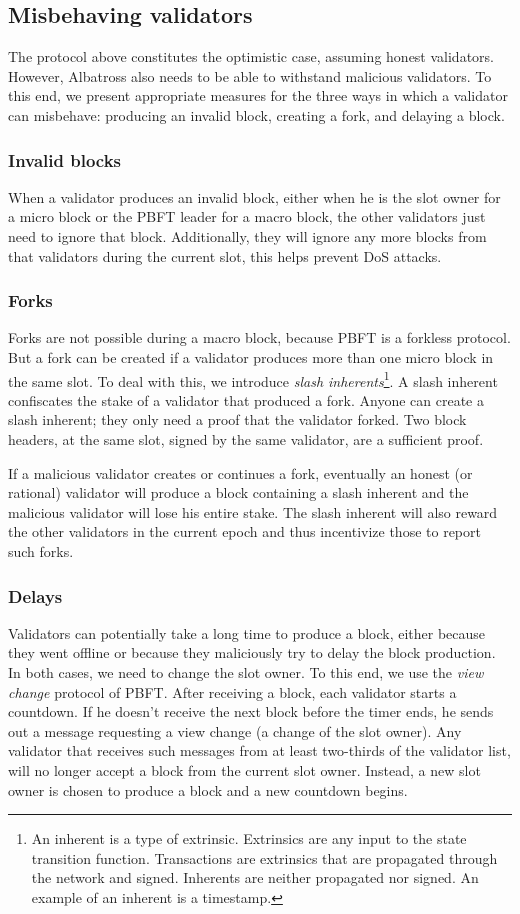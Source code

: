 \documentclass[conference]{IEEEtran}
\begin{document}
\subsection{Misbehaving validators}
The protocol above constitutes the optimistic case, assuming honest validators. However, Albatross also needs to be able to withstand malicious validators. To this end, we present appropriate measures for the three ways in which a validator can misbehave: producing an invalid block, creating a fork, and delaying a block.

\subsubsection{Invalid blocks}
When a validator produces an invalid block, either when he is the slot owner for a micro block or the PBFT leader for a macro block, the other validators just need to ignore that block. Additionally, they will ignore any more blocks from that validators during the current slot, this helps prevent DoS attacks.

\subsubsection{Forks}
Forks are not possible during a macro block, because PBFT is a forkless protocol. But a fork can be created if a validator produces more than one micro block in the same slot. To deal with this, we introduce \textit{slash inherents}\footnote{An inherent is a type of extrinsic. Extrinsics are any input to the state transition function. Transactions are extrinsics that are propagated through the network and signed. Inherents are neither propagated nor signed. An example of an inherent is a timestamp.}. A slash inherent confiscates the stake of a validator that produced a fork. Anyone can create a slash inherent; they only need a proof that the validator forked. Two block headers, at the same slot, signed by the same validator, are a sufficient proof.

If a malicious validator creates or continues a fork, eventually an honest (or rational) validator will produce a block containing a slash inherent and the malicious validator will lose his entire stake. The slash inherent will also reward the other validators in the current epoch and thus incentivize those to report such forks.

\subsubsection{Delays}
Validators can potentially take a long time to produce a block, either because they went offline or because they maliciously try to delay the block production. In both cases, we need to change the slot owner. To this end, we use the \textit{view change} protocol of PBFT. After receiving a block, each validator starts a countdown. If he doesn't receive the next block before the timer ends, he sends out a message requesting a view change (a change of the slot owner). Any validator that receives such messages from at least two-thirds of the validator list, will no longer accept a block from the current slot owner. Instead, a new slot owner is chosen to produce a block and a new countdown begins.
\end{document}

